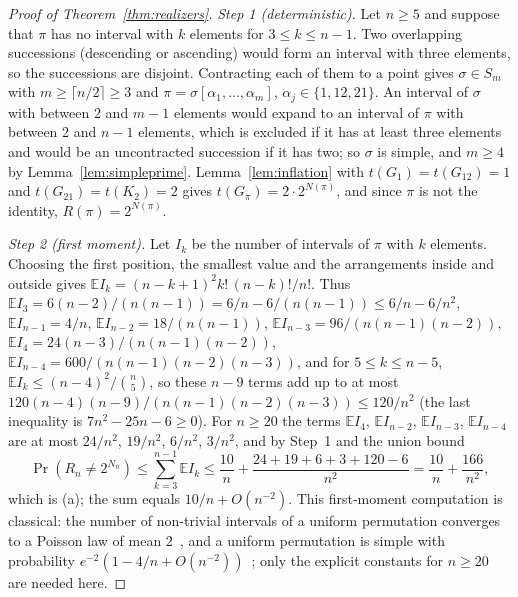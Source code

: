 \documentclass[11pt,a4paper]{article}
\theoremstyle{plain}
\theoremstyle{definition}
\theoremstyle{remark}
\begin{document}
\begin{proof}[Proof of Theorem~\ref{thm:realizers}]
\emph{Step 1 (deterministic).} Let $n\ge5$ and suppose that $\pi$ has no interval with $k$ elements for $3\le k\le n-1$. Two overlapping successions (descending or ascending) would form an interval with three elements, so the successions are disjoint. Contracting each of them to a point gives $\sigma\in S_m$ with $m\ge\lceil n/2\rceil\ge3$ and $\pi=\sigma[\alpha_1,\dots,\alpha_m]$, $\alpha_j\in\{1,12,21\}$. An interval of $\sigma$ with between $2$ and $m-1$ elements would expand to an interval of $\pi$ with between $2$ and $n-1$ elements, which is excluded if it has at least three elements and would be an uncontracted succession if it has two; so $\sigma$ is simple, and $m\ge4$ by Lemma~\ref{lem:simpleprime}. Lemma~\ref{lem:inflation} with $t(G_{1})=t(G_{12})=1$ and $t(G_{21})=t(K_2)=2$ gives $t(G_\pi)=2\cdot2^{N(\pi)}$, and since $\pi$ is not the identity, $R(\pi)=2^{N(\pi)}$.

\emph{Step 2 (first moment).} Let $I_k$ be the number of intervals of $\pi$ with $k$ elements. Choosing the first position, the smallest value and the arrangements inside and outside gives $\mathbb E I_k=(n-k+1)^2k!\,(n-k)!/n!$. Thus $\mathbb E I_3=6(n-2)/(n(n-1))=6/n-6/(n(n-1))\le6/n-6/n^2$, $\mathbb E I_{n-1}=4/n$, $\mathbb E I_{n-2}=18/(n(n-1))$, $\mathbb E I_{n-3}=96/(n(n-1)(n-2))$, $\mathbb E I_4=24(n-3)/(n(n-1)(n-2))$, $\mathbb E I_{n-4}=600/(n(n-1)(n-2)(n-3))$, and for $5\le k\le n-5$, $\mathbb E I_k\le(n-4)^2/\binom n5$, so these $n-9$ terms add up to at most $120(n-4)(n-9)/(n(n-1)(n-2)(n-3))\le120/n^2$ (the last inequality is $7n^2-25n-6\ge0$). For $n\ge20$ the terms $\mathbb E I_4$, $\mathbb E I_{n-2}$, $\mathbb E I_{n-3}$, $\mathbb E I_{n-4}$ are at most $24/n^2$, $19/n^2$, $6/n^2$, $3/n^2$, and by Step~1 and the union bound
\[
\Pr(R_n\ne2^{N_n})\le\sum_{k=3}^{n-1}\mathbb E I_k\le\frac{10}{n}+\frac{24+19+6+3+120-6}{n^2}=\frac{10}{n}+\frac{166}{n^2},
\]
which is (a); the sum equals $10/n+O(n^{-2})$. This first-moment computation is classical: the number of non-trivial intervals of a uniform permutation converges to a Poisson law of mean $2$~\citep{corteel2006}, and a uniform permutation is simple with probability $e^{-2}(1-4/n+O(n^{-2}))$~\citep{albert2003}; only the explicit constants for $n\ge20$ are needed here.


\end{proof}
\end{document}

